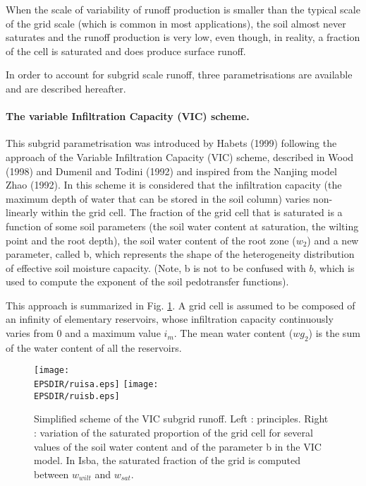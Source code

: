 When the scale of variability of runoff production is smaller than the typical scale
of the grid scale (which is common in most applications), the soil almost never 
saturates and the runoff production is very low, even though, in reality, 
a fraction of the cell is saturated and does produce surface
runoff.

In order to account for subgrid scale runoff, three parametrisations are available and
are described hereafter.

 
\paragraph{The variable Infiltration Capacity (VIC) scheme.}    
%
This subgrid parametrisation was introduced by Habets \etal (1999)\nocite{Habets1999} 
following the approach of the Variable Infiltration Capacity (VIC) scheme,
described in Wood \etal (1998)\nocite{Wood1998} and Dumenil and Todini (1992)\nocite{Dumenil1992} and inspired from the
Nanjing model Zhao (1992)\nocite{Zhao1992}.
In this scheme it is considered that the infiltration capacity (the maximum depth of
water that can be stored in the soil column) varies non-linearly within the grid cell.
The fraction of the grid cell that is saturated is a function of some soil parameters (the
soil water content at saturation, the wilting point and the root depth), the soil water
content of the root zone ($w_2$) and a new parameter, called b, which represents the
shape of the heterogeneity distribution of effective soil moisture
capacity. 
(Note, b is not to be confused with $b$, which is used to compute the
exponent of the soil pedotransfer functions).

This approach is summarized in Fig. \ref{fig:vic}. A grid cell is assumed to be composed of 
an infinity of elementary reservoirs, whose infiltration capacity continuously varies
from 0 and a maximum value $i_m$. The mean water content ($wg_2$) is the sum of
the water content of all the reservoirs.

\begin{figure}[!b]
\centerline{
\texttt{[image: \\EPSDIR/ruisa.eps]}
\texttt{[image: \\EPSDIR/ruisb.eps]}}
\caption{
Simplified scheme of the VIC subgrid runoff.
Left : principles. Right : variation of the saturated proportion of
the grid cell for several values of the soil water content and of the
parameter b in the VIC model. In Isba, the saturated fraction of the
grid is computed between $w_{wilt}$ and $w_{sat}$.
}
\label{fig:vic}
\end{figure}

